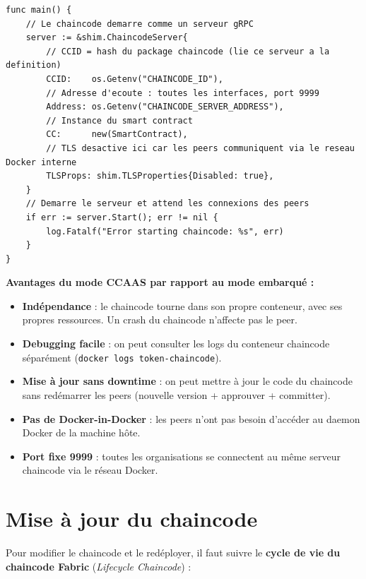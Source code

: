 \documentclass[12pt,a4paper,twoside]{report}
\begin{document}
\begin{lstlisting}[language=golang, caption=Point d'entrée du chaincode en mode CCAAS (main.go)]
func main() {
    // Le chaincode demarre comme un serveur gRPC
    server := &shim.ChaincodeServer{
        // CCID = hash du package chaincode (lie ce serveur a la definition)
        CCID:    os.Getenv("CHAINCODE_ID"),
        // Adresse d'ecoute : toutes les interfaces, port 9999
        Address: os.Getenv("CHAINCODE_SERVER_ADDRESS"),
        // Instance du smart contract
        CC:      new(SmartContract),
        // TLS desactive ici car les peers communiquent via le reseau Docker interne
        TLSProps: shim.TLSProperties{Disabled: true},
    }
    // Demarre le serveur et attend les connexions des peers
    if err := server.Start(); err != nil {
        log.Fatalf("Error starting chaincode: %s", err)
    }
}
\end{lstlisting}

\begin{infobox}
\textbf{Avantages du mode CCAAS par rapport au mode embarqué :}
\begin{itemize}
    \item \textbf{Indépendance} : le chaincode tourne dans son propre conteneur, avec ses propres ressources. Un crash du chaincode n'affecte pas le peer.
    \item \textbf{Debugging facile} : on peut consulter les logs du conteneur chaincode séparément (\texttt{docker logs token-chaincode}).
    \item \textbf{Mise à jour sans downtime} : on peut mettre à jour le code du chaincode sans redémarrer les peers (nouvelle version + approuver + committer).
    \item \textbf{Pas de Docker-in-Docker} : les peers n'ont pas besoin d'accéder au daemon Docker de la machine hôte.
    \item \textbf{Port fixe 9999} : toutes les organisations se connectent au même serveur chaincode via le réseau Docker.
\end{itemize}
\end{infobox}

\section{Mise à jour du chaincode}

Pour modifier le chaincode et le redéployer, il faut suivre le \textbf{cycle de vie du chaincode Fabric} (\textit{Lifecycle Chaincode}) :
\end{document}
